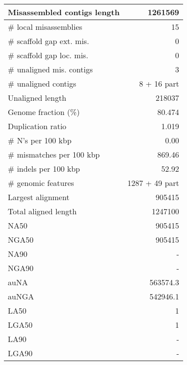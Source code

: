 \documentclass[12pt,a4paper]{article}
\begin{document}
\begin{table}[ht]
\begin{center}
\begin{tabular}{|l*{1}{|r}|}
Misassembled contigs length & 1261569 \\ \hline
\# local misassemblies & 15 \\ \hline
\# scaffold gap ext. mis. & 0 \\ \hline
\# scaffold gap loc. mis. & 0 \\ \hline
\# unaligned mis. contigs & 3 \\ \hline
\# unaligned contigs & 8 + 16 part \\ \hline
Unaligned length & 218037 \\ \hline
Genome fraction (\%) & 80.474 \\ \hline
Duplication ratio & 1.019 \\ \hline
\# N's per 100 kbp & 0.00 \\ \hline
\# mismatches per 100 kbp & 869.46 \\ \hline
\# indels per 100 kbp & 52.92 \\ \hline
\# genomic features & 1287 + 49 part \\ \hline
Largest alignment & 905415 \\ \hline
Total aligned length & 1247100 \\ \hline
NA50 & 905415 \\ \hline
NGA50 & 905415 \\ \hline
NA90 & - \\ \hline
NGA90 & - \\ \hline
auNA & 563574.3 \\ \hline
auNGA & 542946.1 \\ \hline
LA50 & 1 \\ \hline
LGA50 & 1 \\ \hline
LA90 & - \\ \hline
LGA90 & - \\ \hline
\end{tabular}
\end{center}
\end{table}
\end{document}
